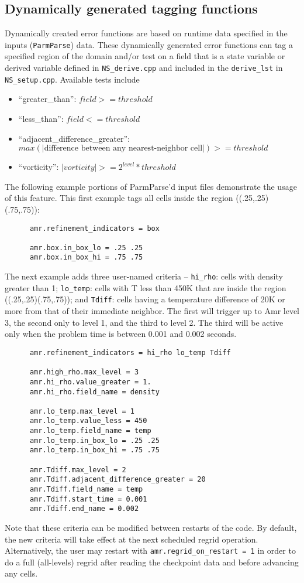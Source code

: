 \subsection{Dynamically generated tagging functions}
Dynamically created error functions are based on runtime data specified in the
inputs ({\tt ParmParse}) data.
These dynamically generated error functions can tag a specified region of the domain and/or test on a field
that is a state variable
or derived variable defined in {\tt NS\_derive.cpp} and included in the {\tt derive\_lst} in {\tt NS\_setup.cpp}.
Available tests include
\begin{itemize}
\item ``greater\_than'': $field >= threshold$
\item ``less\_than'': $field <= threshold$
\item ``adjacent\_difference\_greater'': $max( | \text{difference between any nearest-neighbor cell} | ) >= threshold$
\item ``vorticity'': $ |vorticity| >= 2^{level} * threshold$
\end{itemize}

The following example portions of ParmParse'd input files demonstrate the usage of this feature.
This first example tags all cells inside the region ((.25,.25)(.75,.75)):
\begin{verbatim}
      amr.refinement_indicators = box

      amr.box.in_box_lo = .25 .25
      amr.box.in_box_hi = .75 .75
\end{verbatim}
The next example adds three user-named criteria -- 
{\tt hi\_rho}: cells with density greater than 1;
{\tt lo\_temp}: cells with T less than 450K that are inside the region ((.25,.25)(.75,.75));
and {\tt Tdiff}: cells having a temperature difference of 20K
or more from that of their
immediate neighbor.  The first will trigger up to Amr level 3, the second only to level 1, and the third to level 2.
The third will be active only when the problem time is between 0.001 and 0.002 seconds.
\begin{verbatim}
      amr.refinement_indicators = hi_rho lo_temp Tdiff

      amr.high_rho.max_level = 3
      amr.hi_rho.value_greater = 1.
      amr.hi_rho.field_name = density

      amr.lo_temp.max_level = 1
      amr.lo_temp.value_less = 450
      amr.lo_temp.field_name = temp
      amr.lo_temp.in_box_lo = .25 .25
      amr.lo_temp.in_box_hi = .75 .75

      amr.Tdiff.max_level = 2
      amr.Tdiff.adjacent_difference_greater = 20
      amr.Tdiff.field_name = temp
      amr.Tdiff.start_time = 0.001
      amr.Tdiff.end_name = 0.002
\end{verbatim}
Note that these criteria can be modified between restarts of the code.
By default, the new criteria will take effect at the next
scheduled regrid operation.  Alternatively, the user may restart with {\tt amr.regrid\_on\_restart = 1} in order to
do a full (all-levels) regrid after reading the checkpoint data and before advancing any cells.


